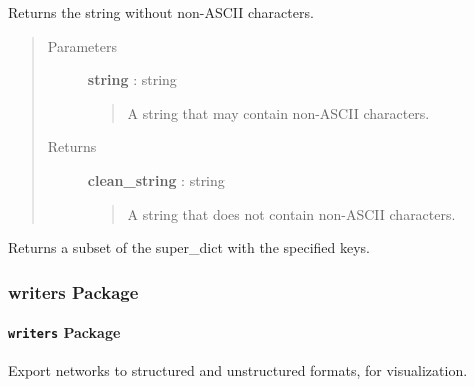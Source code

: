 \documentclass[letterpaper,10pt,english]{sphinxmanual}
\begin{document}
\begin{fulllineitems}
\label{tethne.utilities:tethne.utilities.strip_non_ascii}
Returns the string without non-ASCII characters.
\begin{quote}\begin{description}
\item[{Parameters }] \leavevmode
\textbf{string} : string
\begin{quote}

A string that may contain non-ASCII characters.
\end{quote}

\item[{Returns }] \leavevmode
\textbf{clean\_string} : string
\begin{quote}

A string that does not contain non-ASCII characters.
\end{quote}

\end{description}\end{quote}

\end{fulllineitems}


\begin{fulllineitems}
\label{tethne.utilities:tethne.utilities.subdict}
Returns a subset of the super\_dict with the specified keys.

\end{fulllineitems}



\subsubsection{writers Package}
\label{tethne.writers:writers-package}\label{tethne.writers::doc}

\paragraph{\texttt{writers} Package}
\label{tethne.writers:id1}\label{tethne.writers:module-tethne.writers}
Export networks to structured and unstructured formats, for visualization.
\end{document}
